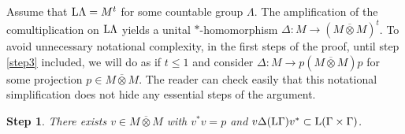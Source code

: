 \documentclass[a4paper,11pt]{amsart}
\numberwithin{equation}{section}
\newtheorem{step}{Step}[section]
\begin{document}
Assume that ${\mathord{\text{\rm L}}} \Lambda = M^t$ for some countable group $\Lambda$. The amplification of the comultiplication on ${\mathord{\text{\rm L}}} \Lambda$ yields a unital $*$-homomorphism ${\Delta} : M {\rightarrow} (M {\mathbin{\overline{\otimes}}} M)^t$. To avoid unnecessary notational complexity, in the first steps of the proof, until step \ref{step3} included, we will do as if $t {\leqslant} 1$ and consider ${\Delta} : M {\rightarrow} p(M {\mathbin{\overline{\otimes}}} M)p$ for some projection $p \in M {\mathbin{\overline{\otimes}}} M$. The reader can check easily that this notational simplification does not hide any essential steps of the argument.

\begin{step}\label{step1}
There exists $v \in M {\mathbin{\overline{\otimes}}} M$ with $v^* v = p$ and $v {\Delta}({\mathord{\text{\rm L}}} \Gamma) v^* \subset {\mathord{\text{\rm L}}}( \Gamma \times \Gamma)$.
\end{step}
\end{document}
